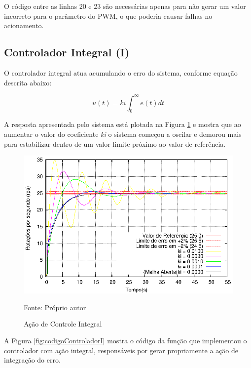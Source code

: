 O código entre as linhas 20 e 23 são necessárias apenas para não gerar um valor incorreto para o parâmetro do PWM, o que poderia causar falhas no acionamento. 










\subsection{ Controlador Integral (I) }

O controlador integral atua acumulando o erro do sistema, conforme equação descrita abaixo:


\begin{equation}
u(t) = ki \int_{0}^{\infty} e(t) dt
\end{equation}

A resposta apresentada pelo sistema está plotada na Figura \ref{fig:acaoI} e mostra que ao aumentar o valor do coeficiente \emph{ki} o sistema começou a oscilar e demorou mais para estabilizar dentro de um valor limite próximo ao valor de referência. 

\begin{figure}[!h]
\centering
\caption{Ação de Controle Integral}
\center\includegraphics[scale=1.3]{./imagens/acaoI.eps}
\label{fig:acaoI}

{\small Fonte: Próprio autor}
\end{figure}

A Figura \ref{fig:codigoControladorI} mostra o código da função que implementou o controlador com ação integral, responsáveis por gerar propriamente a ação de integração do erro.



